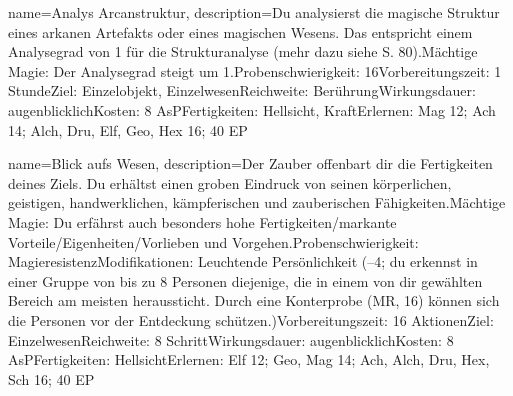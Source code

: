 {
    name={Analys Arcanstruktur},
    description={Du analysierst die magische Struktur eines arkanen Artefakts oder eines magischen Wesens. Das entspricht einem Analysegrad von 1 für die Strukturanalyse (mehr dazu siehe S. 80).\newline Mächtige Magie: Der Analysegrad steigt um 1.\newline Probenschwierigkeit: 16\newline Vorbereitungszeit: 1 Stunde\newline Ziel: Einzelobjekt, Einzelwesen\newline Reichweite: Berührung\newline Wirkungsdauer: augenblicklich\newline Kosten: 8 AsP\newline Fertigkeiten: Hellsicht, Kraft\newline Erlernen: Mag 12; Ach 14; Alch, Dru, Elf, Geo, Hex 16; 40 EP}
}


{
    name={Blick aufs Wesen},
    description={Der Zauber offenbart dir die Fertigkeiten deines Ziels. Du erhältst einen groben Eindruck von seinen körperlichen, geistigen, handwerklichen, kämpferischen und zauberischen Fähigkeiten.\newline Mächtige Magie: Du erfährst auch besonders hohe Fertigkeiten/markante Vorteile/Eigenheiten/Vorlieben und Vorgehen.\newline Probenschwierigkeit: Magieresistenz\newline Modifikationen: Leuchtende Persönlichkeit (–4; du erkennst in einer Gruppe von bis zu 8 Personen diejenige, die in einem von dir gewählten Bereich am meisten heraussticht. Durch eine Konterprobe (MR, 16) können sich die Personen vor der Entdeckung schützen.)\newline Vorbereitungszeit: 16 Aktionen\newline Ziel: Einzelwesen\newline Reichweite: 8 Schritt\newline Wirkungsdauer: augenblicklich\newline Kosten: 8 AsP\newline Fertigkeiten: Hellsicht\newline Erlernen: Elf 12; Geo, Mag 14; Ach, Alch, Dru, Hex, Sch 16; 40 EP}
}


